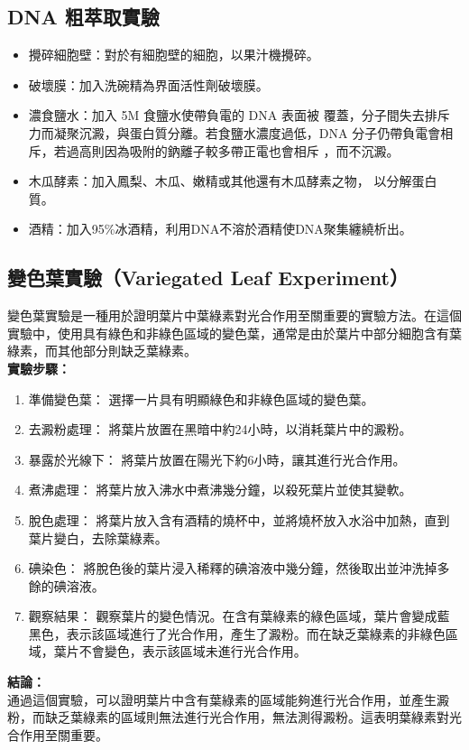 \documentclass[a4paper,12pt]{report}
\begin{document}
\subsection{DNA 粗萃取實驗}
\begin{itemize}
  \item 攪碎細胞壁：對於有細胞壁的細胞，以果汁機攪碎。
  \item 破壞膜：加入洗碗精為界面活性劑破壞膜。
  \item 濃食鹽水：加入 5M 食鹽水使帶負電的 DNA 表面被  覆蓋，分子間失去排斥力而凝聚沉澱，與蛋白質分離。若食鹽水濃度過低，DNA 分子仍帶負電會相斥，若過高則因為吸附的鈉離子較多帶正電也會相斥 ，而不沉澱。
  \item 木瓜酵素：加入鳳梨、木瓜、嫩精或其他還有木瓜酵素之物， 以分解蛋白質。
  \item 酒精：加入95\%冰酒精，利用DNA不溶於酒精使DNA聚集纏繞析出。
\end{itemize}
\subsection{變色葉實驗（Variegated Leaf Experiment）}
變色葉實驗是一種用於證明葉片中葉綠素對光合作用至關重要的實驗方法。在這個實驗中，使用具有綠色和非綠色區域的變色葉，通常是由於葉片中部分細胞含有葉綠素，而其他部分則缺乏葉綠素。\\
\textbf{實驗步驟：}
\begin{enumerate}
\item 準備變色葉： 選擇一片具有明顯綠色和非綠色區域的變色葉。
\item 去澱粉處理： 將葉片放置在黑暗中約24小時，以消耗葉片中的澱粉。
\item 暴露於光線下： 將葉片放置在陽光下約6小時，讓其進行光合作用。
\item 煮沸處理： 將葉片放入沸水中煮沸幾分鐘，以殺死葉片並使其變軟。
\item 脫色處理： 將葉片放入含有酒精的燒杯中，並將燒杯放入水浴中加熱，直到葉片變白，去除葉綠素。
\item 碘染色： 將脫色後的葉片浸入稀釋的碘溶液中幾分鐘，然後取出並沖洗掉多餘的碘溶液。
\item 觀察結果： 觀察葉片的變色情況。在含有葉綠素的綠色區域，葉片會變成藍黑色，表示該區域進行了光合作用，產生了澱粉。而在缺乏葉綠素的非綠色區域，葉片不會變色，表示該區域未進行光合作用。
\end{enumerate}
\textbf{結論：}\\
通過這個實驗，可以證明葉片中含有葉綠素的區域能夠進行光合作用，並產生澱粉，而缺乏葉綠素的區域則無法進行光合作用，無法測得澱粉。這表明葉綠素對光合作用至關重要。
\end{document}
